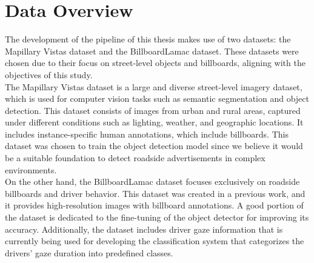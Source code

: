 \section{Data Overview}\label{sec:dataoverview}

The development of the pipeline of this thesis makes use of two datasets: the Mapillary Vistas dataset and the BillboardLamac dataset. These datasets were chosen due to their focus on street-level objects and billboards, aligning with the objectives of this study. \\

The Mapillary Vistas dataset is a large and diverse street-level imagery dataset, which is used for computer vision tasks such as semantic segmentation and object detection. This dataset consists of images from urban and rural areas, captured under different conditions such as lighting, weather, and geographic locations. It includes instance-specific human annotations, which include billboards. This dataset was chosen to train the object detection model since we believe it would be a suitable foundation to detect roadside advertisements in complex environments. \\

On the other hand, the BillboardLamac dataset focuses exclusively on roadside billboards and driver behavior. This dataset was created in a previous work, and it provides high-resolution images with billboard annotations. A good portion of the dataset is dedicated to the fine-tuning of the object detector for improving its accuracy. Additionally, the dataset includes driver gaze information that is currently being used for developing the classification system that categorizes the drivers’ gaze duration into predefined classes. \\
